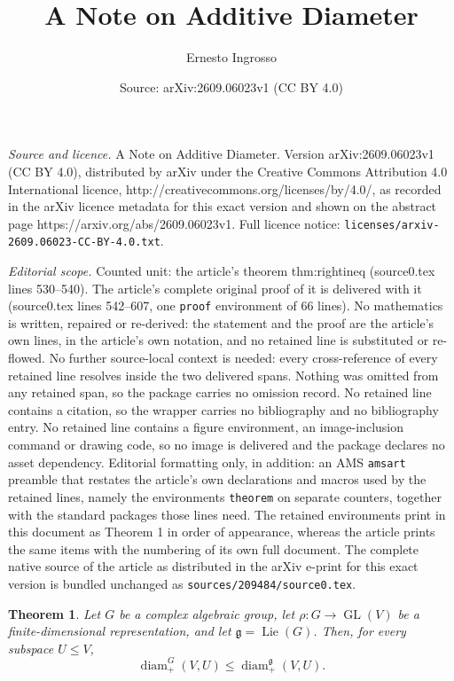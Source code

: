 \documentclass[10pt,a4paper]{amsart}
\title{A Note on Additive Diameter}
\author{Ernesto Ingrosso}
\date{Source: arXiv:2609.06023v1 (CC BY 4.0)}
\newtheorem{theorem}{Theorem}
\begin{document}
\maketitle

\noindent\emph{Source and licence.} A Note on Additive Diameter. Version arXiv:2609.06023v1 (CC BY 4.0), distributed by arXiv under the Creative Commons Attribution 4.0 International licence, http://creativecommons.org/licenses/by/4.0/, as recorded in the arXiv licence metadata for this exact version and shown on the abstract page https://arxiv.org/abs/2609.06023v1. Full licence notice: \texttt{licenses/arxiv-2609.06023-CC-BY-4.0.txt}.\par\smallskip

\noindent\textit{Editorial scope.} Counted unit: the article's theorem thm:rightineq (source0.tex lines 530--540). The article's complete original proof of it is delivered with it (source0.tex lines 542--607, one \texttt{proof} environment of 66 lines). No mathematics is written, repaired or re-derived: the statement and the proof are the article's own lines, in the article's own notation, and no retained line is substituted or re-flowed.  No further source-local context is needed: every cross-reference of every retained line resolves inside the two delivered spans.  Nothing was omitted from any retained span, so the package carries no omission record.  No retained line contains a citation, so the wrapper carries no bibliography and no bibliography entry.  No retained line contains a figure environment, an image-inclusion command or drawing code, so no image is delivered and the package declares no asset dependency.  Editorial formatting only, in addition: an AMS \texttt{amsart} preamble that restates the article's own declarations and macros used by the retained lines, namely the environments \texttt{theorem} on separate counters, together with the standard packages those lines need.  The retained environments print in this document as Theorem 1 in order of appearance, whereas the article prints the same items with the numbering of its own full document.  The complete native source of the article as distributed in the arXiv e-print for this exact version is bundled unchanged as \texttt{sources/209484/source0.tex}.
\begin{theorem}\label{thm:rightineq}
Let $G$ be a complex algebraic group, let
$\rho:G\to\operatorname{GL}(V)$ be a finite-dimensional representation,
and let $\mathfrak g=\operatorname{Lie}(G)$. Then, for every subspace
$U\leq V$,
\[
 \operatorname{diam}^{G}_{+}(V,U)
 \leq
 \operatorname{diam}^{\mathfrak g}_{+}(V,U).
\]
\end{theorem}
\end{document}
